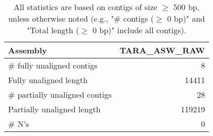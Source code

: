 \documentclass[12pt,a4paper]{article}
\begin{document}
\begin{table}[ht]
\begin{center}
\caption{All statistics are based on contigs of size $\geq$ 500 bp, unless otherwise noted (e.g., "\# contigs ($\geq$ 0 bp)" and "Total length ($\geq$ 0 bp)" include all contigs).}
\begin{tabular}{|l*{1}{|r}|}
\hline
Assembly & TARA\_ASW\_RAW \\ \hline
\# fully unaligned contigs & 8 \\ \hline
Fully unaligned length & 14411 \\ \hline
\# partially unaligned contigs & 28 \\ \hline
Partially unaligned length & 119219 \\ \hline
\# N's & 0 \\ \hline
\end{tabular}
\end{center}
\end{table}
\end{document}
